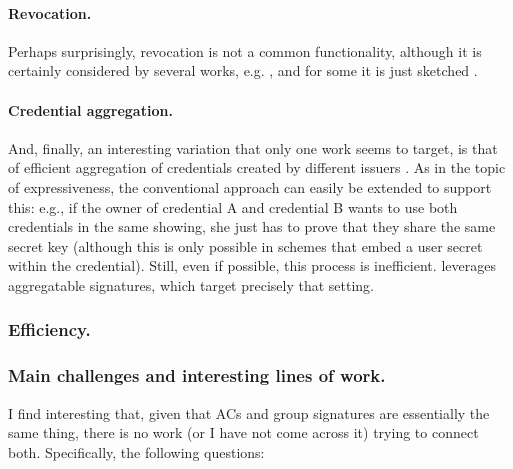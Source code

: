\paragraph{Revocation.} %
Perhaps surprisingly, revocation is not a common functionality, although it is
certainly considered by several works, e.g. \cite{cl01,cks10,ckl+15,bran00}, and
for some it is just sketched \cite{hs21}.

\paragraph{Credential aggregation.} %
And, finally, an interesting variation that only one work seems to target,
is that of efficient aggregation of credentials created by different issuers
\cite{cl11}. As in the topic of expressiveness, the conventional approach
can easily be extended to support this: e.g., if the owner of credential A and
credential B wants to use both credentials in the same showing, she just has to
prove that they share the same secret key (although this is only possible in
schemes that embed a user secret within the credential). Still, even if
possible, this process is inefficient. \cite{cl11} leverages aggregatable
signatures, which target precisely that setting.

\subsubsection{Efficiency.}
%

\subsubsection{Main challenges and interesting lines of work.}
%

I find interesting that, given that ACs and group signatures are
essentially the same thing, there is no work (or I have not come across it)
trying to connect both. Specifically, the following questions:


